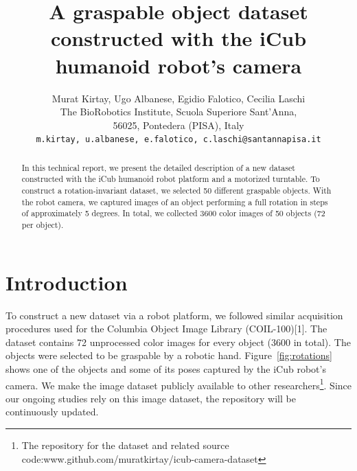 \documentclass{article}
\title{A graspable object dataset constructed  with the  iCub humanoid robot's camera}
\author{
Murat Kirtay, Ugo Albanese, Egidio Falotico, Cecilia Laschi\\
  The BioRobotics Institute, 
Scuola Superiore Sant'Anna,\\
  56025, Pontedera (PISA), Italy\\
  \texttt{{m.kirtay, u.albanese, e.falotico, c.laschi}@santannapisa.it} \\
}
\begin{document}

\maketitle
\pagestyle{empty} 


\begin{abstract}
In this technical report, we present the detailed description of a new dataset constructed with the iCub humanoid robot platform and a motorized turntable.  To construct a rotation-invariant dataset, we selected 50 different graspable objects. With the robot camera, we captured images of an object performing a full rotation in steps of approximately 5 degrees. In total, we collected 3600 color images of 50 objects (72 per object). 
\end{abstract}

\section{Introduction}
To construct a new dataset via a robot platform, we followed similar acquisition procedures used for the Columbia Object Image Library (COIL-100)[1].  The dataset contains 72  unprocessed color images for every object (3600 in total).  The objects were selected to be graspable by a robotic hand.  Figure~\ref{fig:rotations} shows one of the objects and some of its poses captured by the iCub robot's camera.  We make the image dataset publicly available to other researchers\footnote{The repository for the dataset and related source code:www.github.com/muratkirtay/icub-camera-dataset}.
Since our ongoing studies rely on this image dataset, the repository will be continuously updated.
\end{document}
